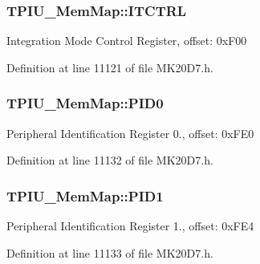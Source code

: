\subsubsection[{\texorpdfstring{I\+T\+C\+T\+RL}{ITCTRL}}]{ T\+P\+I\+U\+\_\+\+Mem\+Map\+::\+I\+T\+C\+T\+RL}\hypertarget{struct_t_p_i_u___mem_map_ac4619f833066fb015a2ff4679fd50fb5}{}\label{struct_t_p_i_u___mem_map_ac4619f833066fb015a2ff4679fd50fb5}
Integration Mode Control Register, offset\+: 0x\+F00 

Definition at line 11121 of file M\+K20\+D7.\+h.

\subsubsection[{\texorpdfstring{P\+I\+D0}{PID0}}]{ T\+P\+I\+U\+\_\+\+Mem\+Map\+::\+P\+I\+D0}\hypertarget{struct_t_p_i_u___mem_map_a8cf104c851fc40c954ff97ddff1d8d3b}{}\label{struct_t_p_i_u___mem_map_a8cf104c851fc40c954ff97ddff1d8d3b}
Peripheral Identification Register 0., offset\+: 0x\+F\+E0 

Definition at line 11132 of file M\+K20\+D7.\+h.

\subsubsection[{\texorpdfstring{P\+I\+D1}{PID1}}]{ T\+P\+I\+U\+\_\+\+Mem\+Map\+::\+P\+I\+D1}\hypertarget{struct_t_p_i_u___mem_map_a2f7285e167ba972adc7d760671b6cd94}{}\label{struct_t_p_i_u___mem_map_a2f7285e167ba972adc7d760671b6cd94}
Peripheral Identification Register 1., offset\+: 0x\+F\+E4 

Definition at line 11133 of file M\+K20\+D7.\+h.

